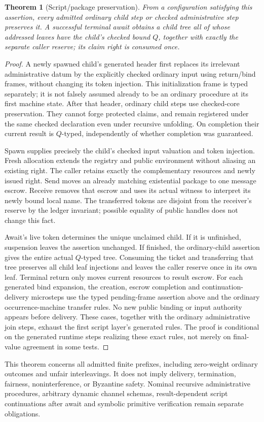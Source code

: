 \documentclass[11pt]{article}
\newtheorem{theorem}{Theorem}
\begin{document}
\begin{theorem}[Script/package preservation]
From a configuration satisfying this assertion, every admitted ordinary child step or checked administrative step preserves it. A successful terminal await obtains a child tree all of whose addressed leaves have the child's checked bound $Q$, together with exactly the separate caller reserve; its claim right is consumed once.
\end{theorem}
\begin{proof}
A newly spawned child's generated header first replaces its irrelevant administrative datum by the explicitly checked ordinary input using return/bind frames, without changing its token injection. This initialization frame is typed separately; it is not falsely assumed already to be an ordinary procedure at its first machine state. After that header, ordinary child steps use checked-core preservation. They cannot forge protected claims, and remain registered under the same checked declaration even under recursive unfolding. On completion their current result is $Q$-typed, independently of whether completion was guaranteed.

Spawn supplies precisely the child's checked input valuation and token injection. Fresh allocation extends the registry and public environment without aliasing an existing right. The caller retains exactly the complementary resources and newly issued right. Send moves an already matching existential package to one message escrow. Receive removes that escrow and uses its actual witness to interpret its newly bound local name. The transferred tokens are disjoint from the receiver's reserve by the ledger invariant; possible equality of public handles does not change this fact.

Await's live token determines the unique unclaimed child. If it is unfinished, suspension leaves the assertion unchanged. If finished, the ordinary-child assertion gives the entire actual $Q$-typed tree. Consuming the ticket and transferring that tree preserves all child leaf injections and leaves the caller reserve once in its own leaf. Terminal return only moves current resources to result escrow. For each generated bind expansion, the creation, escrow completion and continuation-delivery microsteps use the typed pending-frame assertion above and the ordinary occurrence-machine transfer rules. No new public binding or input authority appears before delivery. These cases, together with the ordinary administrative join steps, exhaust the first script layer's generated rules. The proof is conditional on the generated runtime steps realizing these exact rules, not merely on final-value agreement in some tests.
\end{proof}

This theorem concerns all admitted finite prefixes, including zero-weight ordinary outcomes and unfair interleavings. It does not imply delivery, termination, fairness, noninterference, or Byzantine safety. Nominal recursive administrative procedures, arbitrary dynamic channel schemas, result-dependent script continuations after await and symbolic primitive verification remain separate obligations.
\end{document}
